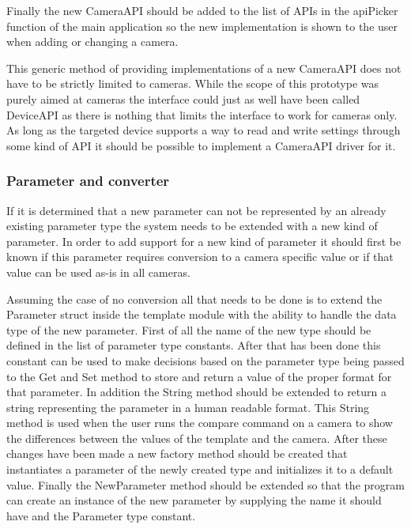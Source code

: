 Finally the new CameraAPI should be added to the list of APIs in the apiPicker function of the main application so the new implementation is shown to the user when adding or changing a camera.

This generic method of providing implementations of a new CameraAPI does not have to be strictly limited to cameras.
While the scope of this prototype was purely aimed at cameras the interface could just as well have been called DeviceAPI as there is nothing that limits the interface to work for cameras only.
As long as the targeted device supports a way to read and write settings through some kind of API it should be possible to implement a CameraAPI driver for it.

\subsubsection{Parameter and converter}
If it is determined that a new parameter can not be represented by an already existing parameter type the system needs to be extended with a new kind of parameter.
In order to add support for a new kind of parameter it should first be known if this parameter requires conversion to a camera specific value or if that value can be used as-is in all cameras.

Assuming the case of no conversion all that needs to be done is to extend the Parameter struct inside the template module with the ability to handle the data type of the new parameter.
First of all the name of the new type should be defined in the list of parameter type constants.
After that has been done this constant can be used to make decisions based on the parameter type being passed to the Get and Set method to store and return a value of the proper format for that parameter.
In addition the String method should be extended to return a string representing the parameter in a human readable format.
This String method is used when the user runs the compare command on a camera to show the differences between the values of the template and the camera.
After these changes have been made a new factory method should be created that instantiates a parameter of the newly created type and initializes it to a default value.
Finally the NewParameter method should be extended so that the program can create an instance of the new parameter by supplying the name it should have and the Parameter type constant.

